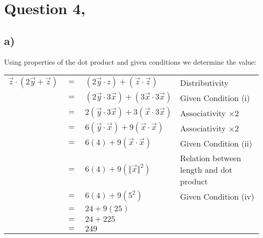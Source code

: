 \documentclass{article}
\begin{document}
\newpage
\section*{Question 4,}
\subsection*{a)}
Using properties of the dot product and given conditions we determine the value:
\begin{table}[htp]
    \centering
    \begin{tabular}{ccll}
        $\vec{z}\cdot(2\vec{y}+\vec{z})$ & $=$ & $(2\vec{y}\cdot{z})+(\vec{z}\cdot\vec{z})$ & Distributivity\\
         & $=$ & $(2\vec{y}\cdot3\vec{x})+(3\vec{x}\cdot3\vec{x})$ & Given Condition (i)\\
         & $=$ & $2(\vec{y}\cdot3\vec{x})+3(\vec{x}\cdot3\vec{x})$ & Associativity $\times 2$\\
         & $=$ & $6(\vec{y}\cdot\vec{x})+9(\vec{x}\cdot\vec{x})$ & Associativity $\times 2$\\
         & $=$ & $6(4)+9(\vec{x}\cdot\vec{x})$ & Given Condition (ii)\\
         & $=$ & $6(4)+9(\Vert \vec{x} \Vert^2)$ & Relation between length and dot product\\
         & $=$ & $6(4)+9(5^2)$ & Given Condition (iv)\\
         & $=$ & $24+9(25)$ & \\
         & $=$ & $24+225$ & \\
         & $=$ & $249$ & \\
    \end{tabular}
\end{table}
\end{document}
